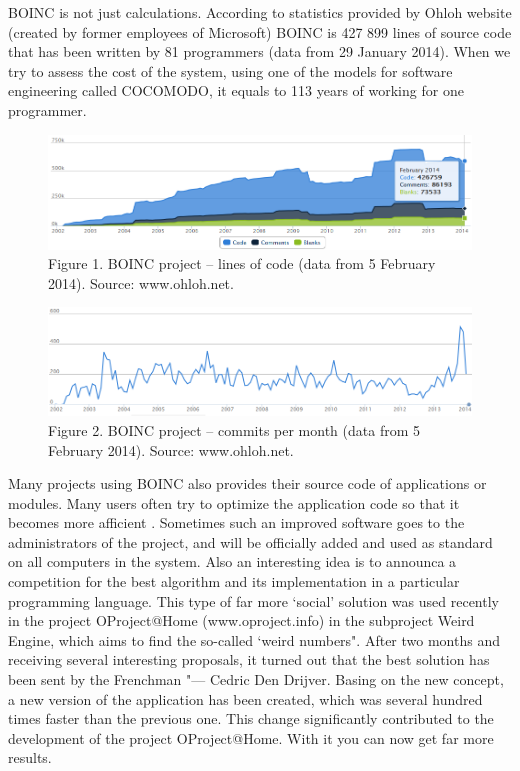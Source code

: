 \documentclass[10pt, a5paper]{article}
\begin{document}
BOINC is not just calculations. According to statistics provided by Ohloh website (created by former employees of Microsoft) BOINC is 427 899 lines of source code that has been written by 81 programmers (data from 29 January 2014). When we try to assess the cost of the system, using one of the models for software engineering called CO\-CO\-MO\-DO, it equals to 113 years of working for one programmer.

\begin{figure}[b!]
  \centering
  \includegraphics[width=\textwidth]{104_2014_w_Swierczewski_ohloh1.png}
  Figure 1. BOINC project – lines of code (data from 5 February 2014). Source: www.ohloh.net.
\end{figure}

\begin{figure}[b!]
  \centering
  \includegraphics[width=\textwidth]{104_2014_w_Swierczewski_ohloh2.png}
  Figure 2. BOINC project – commits per month (data from 5 February 2014). Source: www.ohloh.net.
\end{figure}

Many projects using BOINC also provides their source code of applications or modules. Many users often try to optimize the application code so that it becomes more afficient . Sometimes such an improved software goes to the administrators of the project, and will be officially added and used as standard on all computers in the system. Also an interesting idea is to announca a competition for the best algorithm and its implementation in a particular programming language. This type of far more `social' solution was used recently in the project OPro\-ject@\-Ho\-me (www.oproject.info) in the subproject Weird Engine, which aims to find the so-called `weird numbers". After two months and receiving several interesting proposals, it turned out that the best solution has been sent by the Frenchman "--- Cedric Den Drijver. Basing on the new concept, a new version of the application has been created, which was several hundred times faster than the previous one. This change significantly contributed to the development of the project OPro\-ject@\-Ho\-me. With it you can now get far more results.
\end{document}
